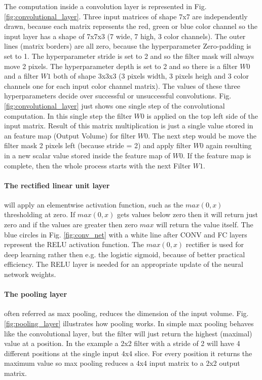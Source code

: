 \documentclass[conference]{IEEEtran}
\begin{document}
The computation inside a convolution layer is represented in Fig. \ref{fig:convolutional_layer}. Three input matrices of shape 7x7 are independently drawn, because each matrix represents the red, green or blue color channel so the input layer has a shape of 7x7x3 (7 wide, 7 high, 3 color channels). The outer lines (matrix borders) are all zero, because the hyperparameter Zero-padding is set to 1. The hyperparameter stride is set to 2 and so the filter mask will always move 2 pixels. The hyperparameter depth is set to 2 and so there is a filter $W0$ and a filter $W1$ both of shape 3x3x3 (3 pixels width, 3 pixels heigh and 3 color channels one for each input color channel matrix). The values of these three hyperparameters decide over successful or unsuccessful convolutions. Fig. \ref{fig:convolutional_layer} just shows one single step of the convolutional computation. In this single step the filter $W0$ is applied on the top left side of the input matrix. Result of this matrix multiplication is just a single value stored in an feature map (Output Volume) for filter $W0$. The next step would be move the filter mask 2 pixels left (because stride = 2) and apply filter $W0$ again resulting in a new scalar value stored inside the feature map of $W0$. If the feature map is complete, then the whole process starts with the next Filter $W1$.

\paragraph{The rectified linear unit layer} will apply an elementwise activation function, such as the $max(0,x)$ thresholding at zero. If $max(0,x)$ gets values below zero then it will return just zero and if the values are greater then zero $max$ will return the value itself. The blue circles in Fig. \ref{fig:conv_net} with a white line after CONV and FC layers represent the RELU activation function. The $max(0,x)$ rectifier is used for deep learning rather then e.g. the logistic sigmoid, because of better practical efficiency. The RELU layer is needed for an appropriate update of the neural network weights.

\paragraph{The pooling layer} often referred as max pooling, reduces the dimension of the input volume. Fig. \ref{fig:pooling_layer} illustrates how pooling works. In simple max pooling behaves like the convolutional layer, but the filter will just return the highest (maximal) value at a position. In the example a 2x2 filter with a stride of 2 will have 4 different positions at the single input 4x4 slice. For every position it returns the maximum value so max pooling reduces a 4x4 input matrix to a 2x2 output matrix.
\end{document}
